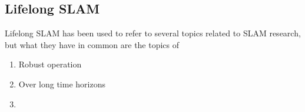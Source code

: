 \subsection{Lifelong SLAM}

Lifelong SLAM has been used to refer to several topics related to SLAM research, but what they have in common are the topics of
\begin{enumerate}
    \item Robust operation
    \item Over long time horizons
    \item 
\end{enumerate}